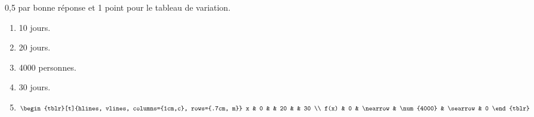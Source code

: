%
%
    0,5 par bonne réponse et 1 point pour le tableau de variation.
    \begin{enumerate}
        \item 10 jours.
        \item 20 jours.
        \item \num{4000} personnes.
        \item 30 jours.
        \item
              $\begin{tblr}[t]{hlines, vlines, columns={1cm,c}, rows={.7cm, m}}
                      x    & 0 &          & 20         &          & 30 \\
                      f(x) & 0 & \nearrow & \num{4000} & \searrow & 0
                  \end{tblr}$
    \end{enumerate}
